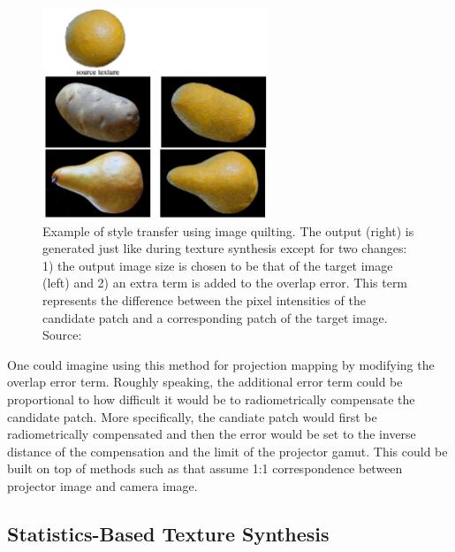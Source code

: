 \begin{figure}[ht]
    \centering
    \includegraphics[width=0.6\textwidth]{images/02-quilting_transfer_compressed.jpg}
    \caption{Example of style transfer using image quilting. The output (right) is generated just like during texture synthesis except for two changes: 1) the output image size is chosen to be that of the target image (left) and 2) an extra term is added to the overlap error. This term represents the difference between the pixel intensities of the candidate patch and a corresponding patch of the target image. Source: \citet{Efros2001}}
    \label{fig:background_quilting_transfer}
\end{figure}

One could imagine using this method for projection mapping by modifying the overlap error term. Roughly speaking, the additional error term could be proportional to how difficult it would be to radiometrically compensate the candidate patch. More specifically, the candiate patch would first be radiometrically compensated and then the error would be set to the inverse distance of the compensation and the limit of the projector gamut. This could be built on top of methods such as \citet{Grundhofer2015} that assume 1:1 correspondence between projector image and camera image.

\subsection{Statistics-Based Texture Synthesis}
\label{section:background-texture_synthesis-statistics_based}

